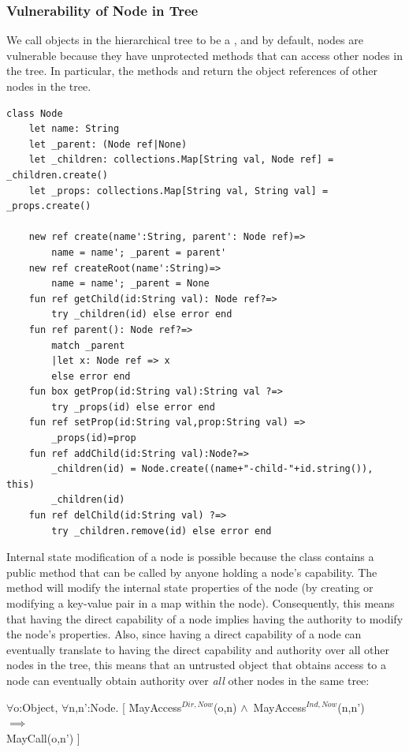 \documentclass[a4paper,11pt,twoside]{article}
\newenvironment{logic}
{\begin{minipage}[c]{\linewidth}  \sffamily \mdseries \begin{tabbing}}
{\end{tabbing}\end{minipage}\vspace{0.3em}}
\newcommand{\loforall}{$\forall$}
\newcommand{\loand}{$\land$}
\newcommand{\loimplies}{$\implies$}
\begin{document}
\subsubsection{Vulnerability of Node in Tree}\label{domnode}
We call objects in the hierarchical tree to be a , and by default, nodes are vulnerable because they have unprotected methods that can access other nodes in the tree. In particular, the methods  and  return the object references of other nodes in the tree.
\begin{lstlisting}
class Node
    let name: String
    let _parent: (Node ref|None)
    let _children: collections.Map[String val, Node ref] = _children.create()
    let _props: collections.Map[String val, String val] = _props.create()

    new ref create(name':String, parent': Node ref)=>
        name = name'; _parent = parent'
    new ref createRoot(name':String)=>
        name = name'; _parent = None 
    fun ref getChild(id:String val): Node ref?=>
        try _children(id) else error end
    fun ref parent(): Node ref?=>
        match _parent
        |let x: Node ref => x 
        else error end
    fun box getProp(id:String val):String val ?=>
        try _props(id) else error end
    fun ref setProp(id:String val,prop:String val) =>
        _props(id)=prop
    fun ref addChild(id:String val):Node?=>
        _children(id) = Node.create((name+"-child-"+id.string()), this)
        _children(id)
    fun ref delChild(id:String val) ?=>
        try _children.remove(id) else error end
\end{lstlisting}


Internal state modification of a node is possible because the class  contains a public method  that can be called by anyone holding a node's capability. The method will modify the internal state properties of the node (by creating or modifying a key-value pair in a map within the node). Consequently, this means that having the direct capability of a node implies having the authority to modify the node's properties. Also, since having a direct capability of a node can eventually translate to having the direct capability and authority over all other nodes in the tree, this means that an untrusted object  that obtains access to a node  can eventually obtain authority over \textit{all} other nodes  in the same tree:\\

\begin{logic}
\loforall o:Object, \loforall n,n':Node. [ \=MayAccess$^{Dir,Now}$(o,n) \loand\ MayAccess$^{Ind,Now}$(n,n')\\
\> \loimplies\\
\> MayCall(o,n') ]\\
\end{logic}
\end{document}
